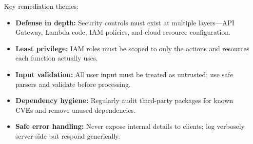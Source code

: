 \documentclass[12pt]{report}
\begin{document}
Key remediation themes:
\begin{itemize}
  \item \textbf{Defense in depth:} Security controls must exist at multiple layers---API Gateway, Lambda code, IAM policies, and cloud resource configuration.
  \item \textbf{Least privilege:} IAM roles must be scoped to only the actions and resources each function actually uses.
  \item \textbf{Input validation:} All user input must be treated as untrusted; use safe parsers and validate before processing.
  \item \textbf{Dependency hygiene:} Regularly audit third-party packages for known CVEs and remove unused dependencies.
  \item \textbf{Safe error handling:} Never expose internal details to clients; log verbosely server-side but respond generically.
\end{itemize}
\end{document}
